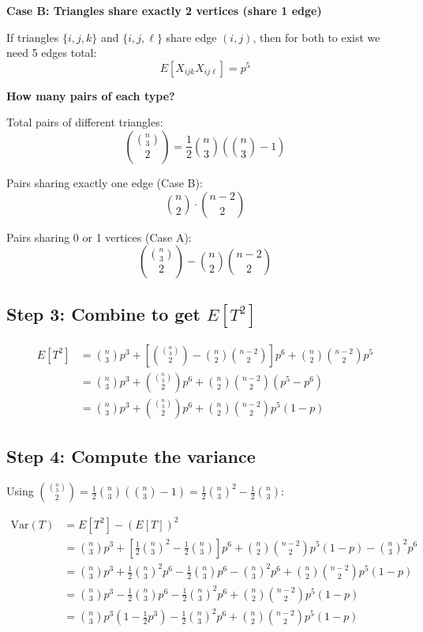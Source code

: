 \documentclass[11pt]{article}
\begin{document}
\textbf{Case B: Triangles share exactly 2 vertices (share 1 edge)}

If triangles $\{i,j,k\}$ and $\{i,j,\ell\}$ share edge $(i,j)$, then for both to exist we need 5 edges total:
\[
E[X_{ijk} X_{ij\ell}] = p^5
\]

\textbf{How many pairs of each type?}

Total pairs of different triangles:
\[
\binom{\binom{n}{3}}{2} = \frac{1}{2}\binom{n}{3}\left(\binom{n}{3} - 1\right)
\]

Pairs sharing exactly one edge (Case B):
\[
\binom{n}{2} \cdot \binom{n-2}{2}
\]

Pairs sharing 0 or 1 vertices (Case A):
\[
\binom{\binom{n}{3}}{2} - \binom{n}{2}\binom{n-2}{2}
\]

\subsection*{Step 3: Combine to get $E[T^2]$}

\begin{align*}
E[T^2] &= \binom{n}{3} p^3 + \left[\binom{\binom{n}{3}}{2} - \binom{n}{2}\binom{n-2}{2}\right] p^6 + \binom{n}{2}\binom{n-2}{2} p^5 \\
&= \binom{n}{3} p^3 + \binom{\binom{n}{3}}{2} p^6 + \binom{n}{2}\binom{n-2}{2} (p^5 - p^6) \\
&= \binom{n}{3} p^3 + \binom{\binom{n}{3}}{2} p^6 + \binom{n}{2}\binom{n-2}{2} p^5(1-p)
\end{align*}

\subsection*{Step 4: Compute the variance}

Using $\binom{\binom{n}{3}}{2} = \frac{1}{2}\binom{n}{3}\left(\binom{n}{3}-1\right) = \frac{1}{2}\binom{n}{3}^2 - \frac{1}{2}\binom{n}{3}$:

\begin{align*}
\text{Var}(T) &= E[T^2] - (E[T])^2 \\
&= \binom{n}{3} p^3 + \left[\frac{1}{2}\binom{n}{3}^2 - \frac{1}{2}\binom{n}{3}\right] p^6 + \binom{n}{2}\binom{n-2}{2} p^5(1-p) - \binom{n}{3}^2 p^6 \\
&= \binom{n}{3} p^3 + \frac{1}{2}\binom{n}{3}^2 p^6 - \frac{1}{2}\binom{n}{3} p^6 - \binom{n}{3}^2 p^6 + \binom{n}{2}\binom{n-2}{2} p^5(1-p) \\
&= \binom{n}{3} p^3 - \frac{1}{2}\binom{n}{3} p^6 - \frac{1}{2}\binom{n}{3}^2 p^6 + \binom{n}{2}\binom{n-2}{2} p^5(1-p) \\
&= \binom{n}{3} p^3\left(1 - \frac{1}{2}p^3\right) - \frac{1}{2}\binom{n}{3}^2 p^6 + \binom{n}{2}\binom{n-2}{2} p^5(1-p)
\end{align*}
\end{document}
